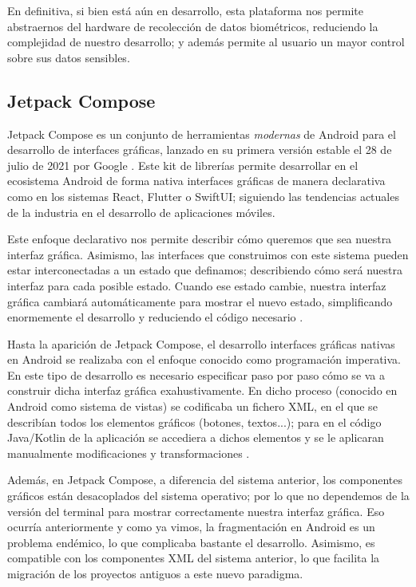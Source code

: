             En definitiva, si bien está aún en desarrollo, esta plataforma nos permite abstraernos del hardware de
            recolección de datos biométricos, reduciendo la complejidad de nuestro desarrollo; y además permite al 
            usuario un mayor control sobre sus datos sensibles.

        \subsection{Jetpack Compose}

            Jetpack Compose es un conjunto de herramientas \textit{modernas} de Android para el desarrollo de 
            interfaces gráficas, lanzado en su primera versión estable el 28 de julio de 2021 por Google
            \cite{bellini_jetpack_2021}. Este kit de librerías permite desarrollar en el ecosistema Android de 
            forma nativa interfaces gráficas de manera declarativa como en los sistemas React, Flutter o SwiftUI;
            siguiendo las tendencias actuales de la industria en el desarrollo de aplicaciones móviles. 

            Este enfoque declarativo nos permite describir cómo queremos que sea nuestra interfaz gráfica. 
            Asimismo, las interfaces que construimos con este sistema pueden estar interconectadas a un estado 
            que definamos; describiendo cómo será nuestra interfaz para cada posible estado. Cuando ese estado cambie, 
            nuestra interfaz gráfica cambiará automáticamente para mostrar el nuevo estado, simplificando enormemente 
            el desarrollo y reduciendo el código necesario \cite{leiva_que_2021}. 

            Hasta la aparición de Jetpack Compose, el desarrollo interfaces gráficas nativas en Android se realizaba 
            con el enfoque conocido como programación imperativa. En este tipo de desarrollo es necesario especificar 
            paso por paso cómo se va a construir dicha interfaz gráfica exahustivamente. En dicho proceso (conocido 
            en Android como sistema de vistas) se codificaba un fichero XML, en el que se describían todos los 
            elementos gráficos (botones, textos...); para en el código Java/Kotlin de la aplicación se accediera 
            a dichos elementos y se le aplicaran manualmente modificaciones y transformaciones 
            \cite{noauthor_programacion_2021}. 

            Además, en Jetpack Compose, a diferencia del sistema anterior, los componentes gráficos están desacoplados 
            del sistema operativo; por lo que no dependemos de la versión del terminal para mostrar correctamente 
            nuestra interfaz gráfica. Eso ocurría anteriormente y como ya vimos, la fragmentación en Android es un 
            problema endémico, lo que complicaba bastante el desarrollo. Asimismo, es compatible con los componentes XML 
            del sistema anterior, lo que facilita la migración de los proyectos antiguos a este nuevo paradigma. 

